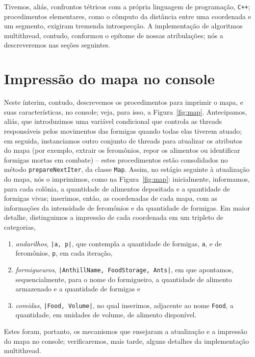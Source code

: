 \documentclass[12pt]{article}
\theoremstyle{definition}
\begin{document}
Tivemos, aliás, confrontos tétricos com a própria linguagem de programação, \texttt{C++}; procedimentos elementares, como o cômputo da distância entre uma coordenada e um segmento, exigiram tremenda introspecção. A implementação de algoritmos multithread, contudo, conformou o epítome de nossas atribulações; nós a descreveremos nas seções seguintes. 

\section{Impressão do mapa no console} 

Neste ínterim, contudo, descrevemos os procedimentos para imprimir o mapa, e suas características, no console; veja, para isso, a Figura~\ref{fig:map}. Antecipamos, aliás, que introduzimos uma variável condicional que controla as threads responsáveis pelos movimentos das formigas quando todas elas tiverem atuado; em seguida, instanciamos outro conjunto de threads para atualizar os atributos do mapa (por exemplo, extrair os feromônios, repor os alimentos ou identificar formigas mortas em combate) -- estes procedimentos estão consolidados no método \texttt{prepareNextIter}, da classe \texttt{Map}. Assim, no estágio seguinte à atualização do mapa, nós o imprimimos, como na Figura~\ref{fig:map}: inicialmente, informamos, para cada colônia, a quantidade de alimentos depositada e a quantidade de formigas vivas; inserimos, então, as coordenadas de cada mapa, com as informações da intensidade de feromônios e da quantidade de formigas. Em maior detalhe, distinguimos a impressão de cada coordenada em um tripleto de categorias, 

\begin{enumerate} 
	\item \textit{andarilhos}, \texttt{|a, p|}, que contempla a quantidade de formigas, \texttt{a}, e de feromônios, \texttt{p}, em cada iteração, 
	\item \textit{formigueuros}, \texttt{|AnthillName, FoodStorage, Ants|}, em que apontamos, sequencialmente, para o nome do formigueiro, a quantidade de alimento armazenado e a quantidade de formigas e 
	\item \textit{comidas}, \texttt{|Food, Volume|}, no qual inserimos, adjacente ao nome \texttt{Food}, a quantidade, em unidades de volume, de alimento disponível. 
\end{enumerate} 

\noindent Estes foram, portanto, os mecanismos que ensejaram a atualização e a impressão do mapa no console; verificaremos, mais tarde, alguns detalhes da implementação multithread. 
\end{document}
